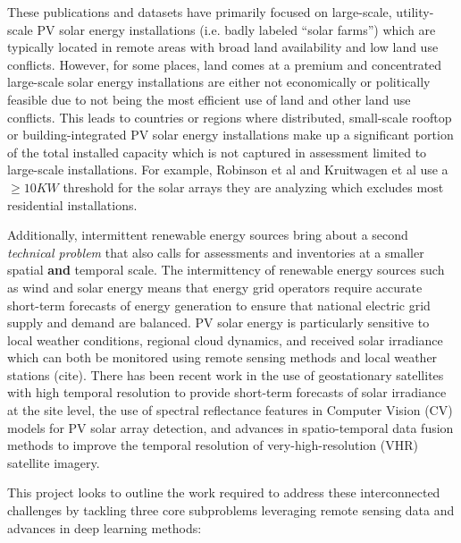 These publications and datasets have primarily focused on large-scale, utility-scale PV solar energy installations (i.e. badly labeled ``solar farms'') which are 
typically located in remote areas with broad land availability and low land use conflicts. However, for some places, land comes at a premium and concentrated large-scale solar energy installations are 
either not economically or politically feasible due to not being the most efficient use of land and other land use conflicts. This leads to countries or regions where distributed, small-scale rooftop or building-integrated 
PV solar energy installations make up a significant portion of the total installed capacity which is not captured in assessment limited to large-scale installations. 
For example, Robinson et al\cite{robinson_ms_planet_global_renewables_watch_2025} and Kruitwagen et al\cite{kruitwagen_global_inventory_pv_units_2021} use a $\ge10KW$ threshold for the solar arrays they are analyzing which excludes most residential installations.  

Additionally, intermittent renewable energy sources bring about a second \textit{technical problem} that also calls for assessments and inventories at a smaller spatial \textbf{and} temporal scale. The intermittency of renewable energy sources such as wind and solar energy means that energy grid operators require accurate short-term forecasts of energy generation to ensure that national electric grid 
supply and demand are balanced. PV solar energy is particularly sensitive to local weather conditions, regional cloud dynamics, and received solar irradiance which can both be monitored using 
remote sensing methods and local weather stations (cite). There has been recent work in the use of geostationary satellites with high temporal resolution to provide short-term forecasts of solar irradiance at the site level\cite{Bansal_ssl_nowcasting_2022}, 
the use of spectral reflectance features in Computer Vision (CV) models for PV solar array detection\cite{He_universal_pv_spectral_index_2024}, and advances in spatio-temporal data fusion methods to improve the temporal resolution of very-high-resolution (VHR) satellite imagery\cite{Tremenbert_Kasmi_pyPV_roof_2023}. 

This project looks to outline the work required to address these interconnected challenges by tackling three core subproblems leveraging remote sensing data and advances in deep learning methods:

